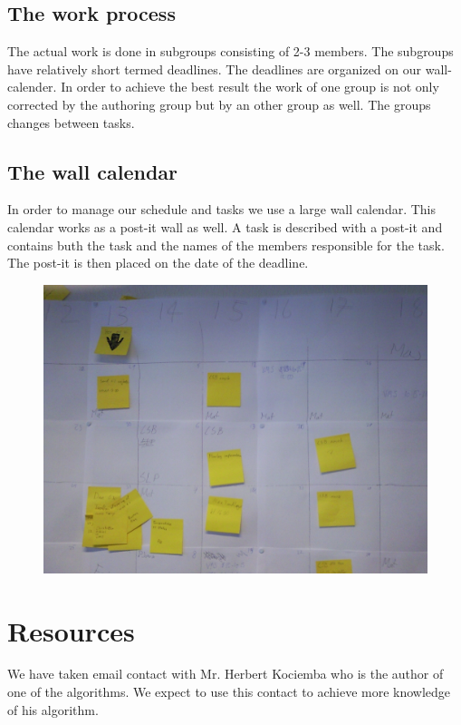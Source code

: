 \documentclass{article}
\begin{document}
\subsection{The work process}
The actual work is done in subgroups consisting of 2-3 members.  The subgroups have relatively short termed deadlines. The deadlines are organized on our wall-calender. In order to achieve the best result the work of one group is not only corrected by the authoring group but by an other group as well. The groups changes between tasks. 

\subsection{The wall calendar}
In order to manage our schedule and tasks we use a large wall calendar. This calendar works as a post-it wall as well. A task is described with a post-it and contains buth the task and the names of the members responsible for the task. The post-it is then placed on the date of the deadline.
\begin{figure}[hp]
	\centering
		\includegraphics[scale = 0.1]{Billede0075.jpg}
		
		\label{fig:wall}
\end{figure}


\section{Resources}
We have taken email contact with Mr. Herbert Kociemba who is the author of one of the algorithms. We expect to use this contact to achieve more knowledge of his algorithm.
\end{document}
